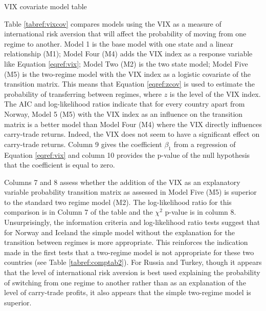 \documentclass[12pt, a4paper, oneside]{article}\usepackage[]{graphicx}\usepackage[]{color}
\begin{document}
\begin{landscape}
\begin{table}[t]
\begin{threeparttable}
\begin{tablenotes}
\end{tablenotes}
\caption{VIX covariate model table}
\label{tabref:vixcov}
\end{threeparttable}
\end{table}
\end{landscape}

Table \ref{tabref:vixcov} compares models using the VIX as a measure of international risk aversion that will affect the probability of moving from one regime to another.   Model 1 is the base model with one state and a linear relationship (M1); Model Four (M4) adds the VIX index as a response variable like Equation \ref{eqref:vix}; Model Two (M2) is the two state model; Model Five (M5) is the two-regime model with the VIX index as a logistic covariate of the transition matrix.  This means that Equation \ref{eqref:zcov} is used to estimate the probability of transferring between regimes, where $z$ is the level of the VIX index.  The AIC and log-likelihood ratios indicate that for every country apart from Norway, Model 5 (M5) with the VIX index as an influence on the transition matrix is a better model than Model Four (M4) where the VIX directly influences carry-trade returns.  Indeed, the VIX does not seem to have a significant effect on carry-trade returns.  Column 9 gives the coefficient $\beta_1$ from a regression of Equation \ref{eqref:vix} and column 10 provides the p-value of the null hypothesis that the coefficient is equal to zero. 

Columns 7 and 8 assess whether the addition of the VIX as an explanatory variable probability transition matrix as assessed in Model Five (M5) is superior to the standard two regime model (M2).  The log-likelihood ratio for this comparison is in Column 7 of the table and the $\chi^2$ p-value is in column 8.  Unsurprisingly,  the information criteria and log-likelihood ratio tests suggest that for Norway and Iceland the simple model without the explanation for the transition between regimes is more appropriate. This reinforces the indication made in the first tests that a two-regime model is not appropriate for these two countries (see Table \ref{tabref:comptab2}).  For Russia and Turkey, though it appears that the level of international risk aversion is best used explaining the probability of switching from one regime to another rather than as an explanation of the level of carry-trade profits, it also appears that the simple two-regime model is superior. 
\end{document}
